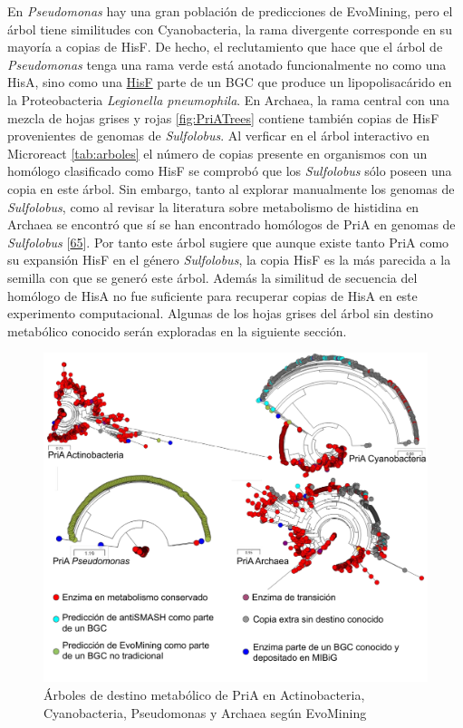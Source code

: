 \documentclass[12pt,twoside]{reedthesis}
\begin{document}
  En \emph{Pseudomonas} hay una gran población de predicciones de
  EvoMining, pero el árbol tiene similitudes con Cyanobacteria, la rama
  divergente corresponde en su mayoría a copias de HisF. De hecho, el
  reclutamiento que hace que el árbol de \emph{Pseudomonas} tenga una rama
  verde está anotado funcionalmente no como una HisA, sino como una
  \href{https://www.ncbi.nlm.nih.gov/protein/CAB65215.1/}{HisF} parte de
  un BGC que produce un lipopolisacárido en la Proteobacteria
  \emph{Legionella pneumophila}. En Archaea, la rama central con una
  mezcla de hojas grises y rojas \autoref{fig:PriATrees} contiene también
  copias de HisF provenientes de genomas de \emph{Sulfolobus}. Al verficar
  en el árbol interactivo en Microreact \autoref{tab:arboles} el número de
  copias presente en organismos con un homólogo clasificado como HisF se
  comprobó que los \emph{Sulfolobus} sólo poseen una copia en este árbol.
  Sin embargo, tanto al explorar manualmente los genomas de
  \emph{Sulfolobus}, como al revisar la literatura sobre metabolismo de
  histidina en Archaea se encontró que sí se han encontrado homólogos de
  PriA en genomas de \emph{Sulfolobus}
  {[}\protect\hyperlink{ref-fondi_evolution_2009}{65}{]}. Por tanto este
  árbol sugiere que aunque existe tanto PriA como su expansión HisF en el
  género \emph{Sulfolobus}, la copia HisF es la más parecida a la semilla
  con que se generó este árbol. Además la similitud de secuencia del
  homólogo de HisA no fue suficiente para recuperar copias de HisA en este
  experimento computacional. Algunas de los hojas grises del árbol sin
  destino metabólico conocido serán exploradas en la siguiente sección.
  
  \begin{figure}[h!tbp]
  \centering
  \includegraphics[angle = 0,scale = 0.8]{chapter4/PriAEvoMining.pdf}
  \caption[Árboles de destino metabólico de PriA en Actinobacteria, Cyanobacteria, {Pseudomonas} y Archaea según EvoMining]{\footnotesize{Árboles de destino metabólico de PriA en Actinobacteria, Cyanobacteria, {Pseudomonas} y Archaea según EvoMining}}
  \label{fig:PriATrees}
  \end{figure}
  
\end{document}

